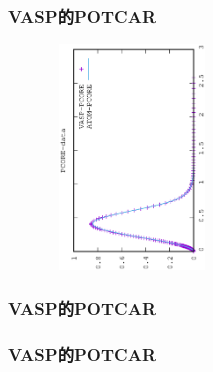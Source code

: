\frame
{
	\frametitle{\rm{VASP}的\rm{POTCAR}}
\begin{minipage}{0.40\textwidth}
\centering
\vspace{-0.05in}
\fontsize{2.7pt}{1.2pt}\selectfont{
}
\end{minipage}
\begin{minipage}{0.58\textwidth}
\begin{figure}[t!]
\centering
\vspace{-0.05in}
\includegraphics[height=2.35in,width=1.75in,viewport=0 0 350 550, angle=-90, clip]{Figures/PCORE-data.eps}
\label{local-potential}
\end{figure}
\end{minipage}
}

\frame
{
	\frametitle{\rm{VASP}的\rm{POTCAR}}
\centering
\vspace{-0.15in}
\fontsize{2.7pt}{1.2pt}\selectfont{
}
}

\frame
{
	\frametitle{\rm{VASP}的\rm{POTCAR}}
\centering
\vspace{-0.15in}
\fontsize{2.7pt}{1.2pt}\selectfont{
}
}

